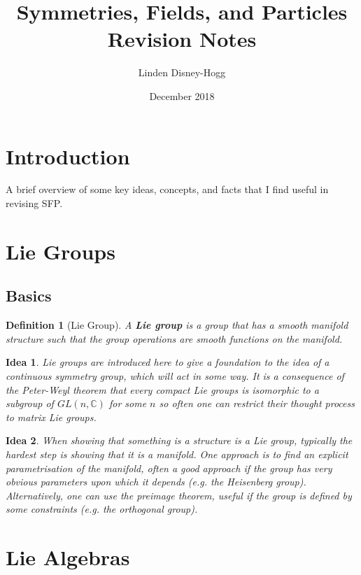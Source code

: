\documentclass{article}
\title{Symmetries, Fields, and Particles Revision Notes}
\author{Linden Disney-Hogg}
\date{December 2018}
\newtheorem{definition}{Definition}[subsection]
\newtheorem*{idea}{Idea}
\newcommand{\bam}[1]{\textbf{#1}}
\newcommand{\mbb}[1]{\mathbb{#1}}
\begin{document}
\maketitle
\tableofcontents

\section{Introduction}
A brief overview of some key ideas, concepts, and facts that I find useful in revising SFP. 

\section{Lie Groups}
\subsection{Basics}
\begin{definition}[Lie Group]
A \bam{Lie group} is a group that has a smooth manifold structure such that the group operations are smooth functions on the manifold. 
\end{definition}

\begin{idea}
Lie groups are introduced here to give a foundation to the idea of a continuous symmetry group, which will act in some way. It is a consequence of the Peter-Weyl theorem that every compact Lie groups is isomorphic to a subgroup of $GL(n,\mbb{C})$ for some $n$ so often one can restrict their thought process to matrix Lie groups. 
\end{idea}

\begin{idea}
When showing that something is a structure is a Lie group, typically the hardest step is showing that it is a manifold. One approach is to find an explicit parametrisation of the manifold, often a good approach if the group has very obvious parameters upon which it depends (e.g. the Heisenberg group). Alternatively, one can use the preimage theorem, useful if the group is defined by some constraints (e.g. the orthogonal group). 
\end{idea}

\section{Lie Algebras}
\end{document}

